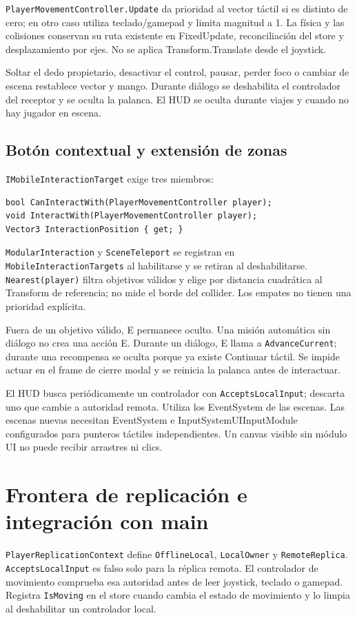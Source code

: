 \documentclass[11pt,letterpaper,oneside]{article}
\newcommand{\code}[1]{\nolinkurl{#1}}
\begin{document}
\code{PlayerMovementController.Update} da prioridad al vector táctil si es distinto de cero; en otro caso utiliza teclado/gamepad y limita magnitud a 1. La física y las colisiones conservan su ruta existente en FixedUpdate, reconciliación del store y desplazamiento por ejes. No se aplica Transform.Translate desde el joystick.

Soltar el dedo propietario, desactivar el control, pausar, perder foco o cambiar de escena restablece vector y mango. Durante diálogo se deshabilita el controlador del receptor y se oculta la palanca. El HUD se oculta durante viajes y cuando no hay jugador en escena.

\subsection{Botón contextual y extensión de zonas}
\code{IMobileInteractionTarget} exige tres miembros:
\begin{lstlisting}
bool CanInteractWith(PlayerMovementController player);
void InteractWith(PlayerMovementController player);
Vector3 InteractionPosition { get; }
\end{lstlisting}
\code{ModularInteraction} y \code{SceneTeleport} se registran en \code{MobileInteractionTargets} al habilitarse y se retiran al deshabilitarse. \code{Nearest(player)} filtra objetivos válidos y elige por distancia cuadrática al Transform de referencia; no mide el borde del collider. Los empates no tienen una prioridad explícita.

Fuera de un objetivo válido, E permanece oculto. Una misión automática sin diálogo no crea una acción E. Durante un diálogo, E llama a \code{AdvanceCurrent}; durante una recompensa se oculta porque ya existe Continuar táctil. Se impide actuar en el frame de cierre modal y se reinicia la palanca antes de interactuar.

El HUD busca periódicamente un controlador con \code{AcceptsLocalInput}; descarta uno que cambie a autoridad remota. Utiliza los EventSystem de las escenas. Las escenas nuevas necesitan EventSystem e InputSystemUIInputModule configurados para punteros táctiles independientes. Un canvas visible sin módulo UI no puede recibir arrastres ni clics.

\section{Frontera de replicación e integración con main}
\code{PlayerReplicationContext} define \code{OfflineLocal}, \code{LocalOwner} y \code{RemoteReplica}. \code{AcceptsLocalInput} es falso solo para la réplica remota. El controlador de movimiento comprueba esa autoridad antes de leer joystick, teclado o gamepad. Registra \code{IsMoving} en el store cuando cambia el estado de movimiento y lo limpia al deshabilitar un controlador local.
\end{document}
